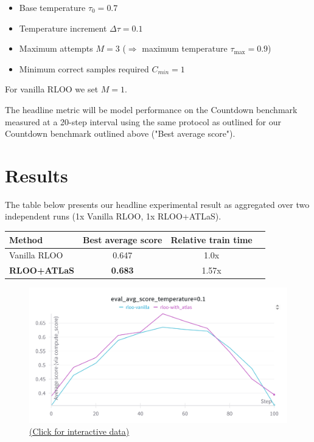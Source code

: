 \documentclass{article}
\begin{document}
\begin{itemize}
    \item Base temperature $\tau_0 = 0.7$
    \item Temperature increment $\Delta\tau = 0.1$
    \item Maximum attempts $M = 3$ ($\Rightarrow$ maximum temperature $\tau_{\max} = 0.9$)
    \item Minimum correct samples required $C_{min} = 1$
\end{itemize}

For vanilla RLOO we set $M=1$.

The headline metric will be model performance on the Countdown benchmark measured at a 20-step interval using the same protocol as outlined for our Countdown benchmark outlined above ("Best average score").

\section{Results}

The table below presents our headline experimental result as aggregated over two independent runs (1x Vanilla RLOO, 1x RLOO+ATLaS).

\begin{table}[h]
\centering
\label{tab:main_results}
\begin{tabular}{lccc}
\toprule
Method & Best average score & Relative train time \\
\midrule
Vanilla RLOO & 0.647 & 1.0x & \\
\textbf{RLOO+ATLaS} & \textbf{0.683} & 1.57x \\
\bottomrule
\end{tabular}
\end{table}

\begin{figure}[h]
  \centering
  \includegraphics[width=0.8\columnwidth]{rloocomp.png}
  \vspace{-10pt}
  \caption*{\href{https://wandb.ai/jonathanalgar/countdown-rl-prod/workspace/panel/etxgwewfv}{(Click for interactive data)}}
\end{figure}
\end{document}
